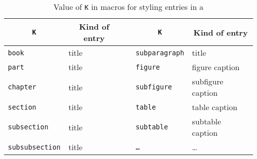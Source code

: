 \begin{table}
\centering
\caption{Value of \texttt{K} in macros for styling entries in a \listofx}
\label{tab:Klistofxtitles}
\begin{tabular}{llcll} \toprule
\multicolumn{1}{c}{\texttt{K}} & \multicolumn{1}{c}{Kind of entry} & & 
\multicolumn{1}{c}{\texttt{K}} & \multicolumn{1}{c}{Kind of entry} \\ \midrule
\texttt{book} & \cmd{\book} title & & \texttt{subparagraph} & \cmd{\subparagraph} title \\
\texttt{part} & \cmd{\part} title & & \texttt{figure} & figure caption  \\
\texttt{chapter} & \cmd{\chapter} title & & \texttt{subfigure} & subfigure caption \\
\texttt{section} & \cmd{\section} title & & \texttt{table} & table caption \\
\texttt{subsection} & \cmd{\subsection} title & & \texttt{subtable} & subtable caption \\
\texttt{subsubsection} & \cmd{\subsubsection} title & & \texttt{\ldots} & \ldots  \\
\bottomrule
\end{tabular}
\end{table}


